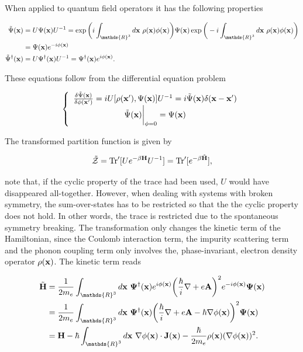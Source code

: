 When applied to quantum field operators it has the following properties 

\begin{align}
    {\tilde \Psi}({\bf x}) &= U {\Psi}({\bf x}) U^{-1} = \exp\bigg(i \int_{\mathds{R}^3} d{\bf x} \blanky \rho({\bf x}) \phi({\bf x}) \bigg) {\Psi}({\bf x}) \exp\bigg(-i \int_{\mathds{R}^3} d{\bf x} \blanky \rho({\bf x}) \phi({\bf x}) \bigg) \\
    &= {\Psi}({\bf x}) e^{-i \phi({\bf x})} \\
    {\tilde \Psi}^\dagger({\bf x}) &= U {\Psi}^\dagger({\bf x}) U^{-1} = {\Psi}^\dagger({\bf x}) e^{i \phi({\bf x})}.
\end{align}

These equations follow from the differential equation problem

$$
    \left\{\begin{array}{cc}
         \frac{\delta \tilde{\Psi}({\bf x})}{\delta \phi({\bf x'})} = i U [\rho({\bf x}'), \Psi({\bf x})] U^{-1} = i \tilde{\Psi}({\bf x}) \delta({\bf x}-{\bf x}')  \\
         \tilde{\Psi}({\bf x})\bigg|_{\phi = 0} = \Psi({\bf x})
    \end{array} \right.
$$

The transformed partition function is given by 

$$
    \tilde{\mathcal{Z}} = \Tr' [U e^{-\beta {\bf H}} U^{-1}] = \Tr' [e^{-\beta \tilde{\bf H}}],
$$

note that, if the cyclic property of the trace had been used, $U$ would have disappeared all-together. However, when dealing with systems with broken symmetry, the sum-over-states has to be restricted so that the the cyclic property does not hold. In other words, the trace is restricted due to the spontaneous symmetry breaking. The transformation only changes the kinetic term of the Hamiltonian, since the Coulomb interaction term, the impurity scattering term and the phonon coupling term only involves the, phase-invariant, electron density operator $\rho({\bf x})$. The kinetic term reads

\begin{equation}
    \begin{split}
        \tilde{\bf H} &= \frac{1}{2m_e} \int_{\mathds{R}^3} d{\bf x} \blanky {\bf \Psi}^\dagger({\bf x}) e^{i\phi({\bf x)}} \bigg(\frac{\hbar}{i} \nabla + e {\bf A}\bigg)^2 e^{-i\phi({\bf x)}} {\bf \Psi}({\bf x}) \\
        &= \frac{1}{2m_e} \int_{\mathds{R}^3} d{\bf x} \blanky {\bf \Psi}^\dagger({\bf x}) \bigg(\frac{\hbar}{i} \nabla + e {\bf A} - \hbar \nabla \phi({\bf x})\bigg)^2 {\bf \Psi}({\bf x}) \\
        &= {\bf H} - \hbar \int_{\mathds{R}^3} d{\bf x} \blanky \nabla \phi({\bf x}) \cdot {\bf J}({\bf x}) - \frac{\hbar}{2m_e} \rho({\bf x}) (\nabla \phi({\bf x}))^2.
    \end{split}
\end{equation}

